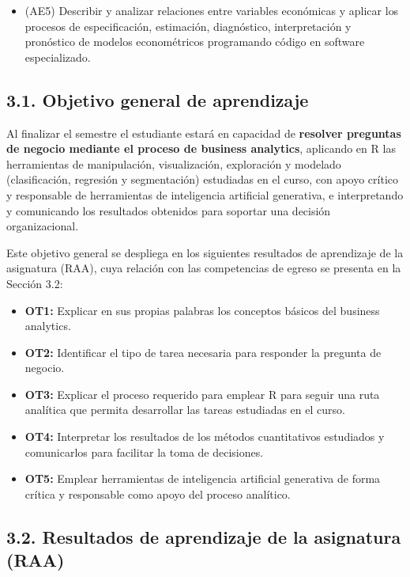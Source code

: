 \documentclass[11pt,a4paper]{article}
\begin{document}
\begin{itemize}
    \item (AE5) Describir y analizar relaciones entre variables económicas y aplicar los procesos de especificación, estimación, diagnóstico, interpretación y pronóstico de modelos econométricos programando código en software especializado.
\end{itemize}

\subsection*{3.1. Objetivo general de aprendizaje}

Al finalizar el semestre el estudiante estará en capacidad de \textbf{resolver preguntas de negocio mediante el proceso de business analytics}, aplicando en R las herramientas de manipulación, visualización, exploración y modelado (clasificación, regresión y segmentación) estudiadas en el curso, con apoyo crítico y responsable de herramientas de inteligencia artificial generativa, e interpretando y comunicando los resultados obtenidos para soportar una decisión organizacional.

\vspace{0.3cm}

Este objetivo general se despliega en los siguientes resultados de aprendizaje de la asignatura (RAA), cuya relación con las competencias de egreso se presenta en la Sección 3.2:

\begin{itemize}
    \item \textbf{OT1:} Explicar en sus propias palabras los conceptos básicos del business analytics.
    \item \textbf{OT2:} Identificar el tipo de tarea necesaria para responder la pregunta de negocio.
    \item \textbf{OT3:} Explicar el proceso requerido para emplear R para seguir una ruta analítica que permita desarrollar las tareas estudiadas en el curso.
    \item \textbf{OT4:} Interpretar los resultados de los métodos cuantitativos estudiados y comunicarlos para facilitar la toma de decisiones.
    \item \textbf{OT5:} Emplear herramientas de inteligencia artificial generativa de forma crítica y responsable como apoyo del proceso analítico.
\end{itemize}

\subsection*{3.2. Resultados de aprendizaje de la asignatura (RAA)}
\end{document}

